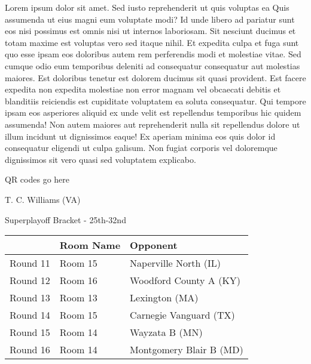 \documentclass{article}%
\begin{document}
\vspace*{8pt}%
\linebreak%
\newline%
\newline%
    Lorem ipsum dolor sit amet. Sed iusto reprehenderit ut quis voluptas ea Quis assumenda ut eius magni eum voluptate modi? Id unde libero ad pariatur sunt eos nisi possimus est omnis nisi ut internos laboriosam. Sit nesciunt ducimus et totam maxime est voluptas vero sed itaque nihil. Et expedita culpa et fuga sunt quo esse ipsam eos doloribus autem rem perferendis modi et molestiae vitae.\newline%
\newline%
    Sed cumque odio eum temporibus deleniti ad consequatur consequatur aut molestias maiores. Est doloribus tenetur est dolorem ducimus sit quasi provident. Est facere expedita non expedita molestiae non error magnam vel obcaecati debitis et blanditiis reiciendis est cupiditate voluptatem ea soluta consequatur. Qui tempore ipsam eos asperiores aliquid ex unde velit est repellendus temporibus hic quidem assumenda!\newline%
\newline%
    Non autem maiores aut reprehenderit nulla sit repellendus dolore ut illum incidunt ut dignissimos eaque! Ex aperiam minima eos quis dolor id consequatur eligendi ut culpa galisum. Non fugiat corporis vel doloremque dignissimos sit vero quasi sed voluptatem explicabo.\newline%
\newline%
\vspace*{30pt}%
\begin{center}%
\begin{Huge}%
QR codes go here%
\end{Huge}%
\end{center}%
\newpage%
\begin{center}%
\begin{Huge}%
T. C. Williams (VA)%
\end{Huge}%
\vspace*{8pt}%
\linebreak%
\begin{Large}%
Superplayoff Bracket {-} 25th{-}32nd%
\end{Large}%
\end{center}%
%
\begin{tabularx}{\textwidth}{|c|Y|Y|}%
\hline%
&Room Name&Opponent\\%
\hline%
Round 11&Room 15&Naperville North (IL)\\%
Round 12&Room 16&Woodford County A (KY)\\%
Round 13&Room 13&Lexington (MA)\\%
Round 14&Room 15&Carnegie Vanguard (TX)\\%
Round 15&Room 14&Wayzata B (MN)\\%
Round 16&Room 14&Montgomery Blair B (MD)\\%
\hline%
\end{tabularx}%
\end{document}
